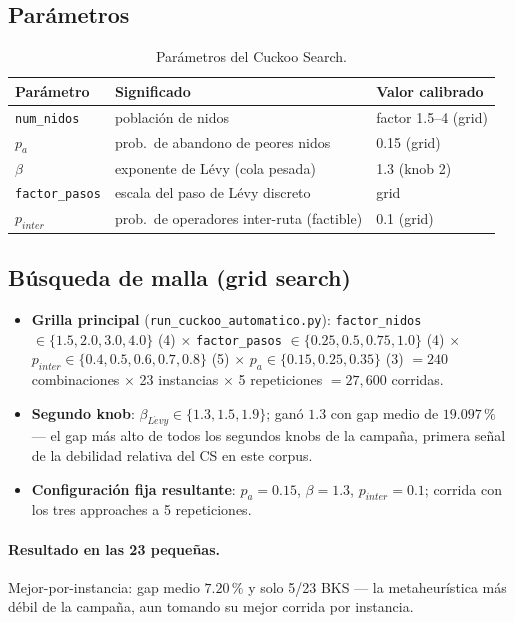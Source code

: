 \subsection{Parámetros}
\begin{table}[htbp]
\centering
\caption{Parámetros del Cuckoo Search.}
\begin{tabular}{lll}
\toprule
Parámetro & Significado & Valor calibrado \\
\midrule
\texttt{num\_nidos} & población de nidos & factor 1.5--4 (grid) \\
$p_a$ & prob.\ de abandono de peores nidos & 0.15 (grid) \\
$\beta$ & exponente de Lévy (cola pesada) & 1.3 (knob 2) \\
\texttt{factor\_pasos} & escala del paso de Lévy discreto & grid \\
$p_{inter}$ & prob.\ de operadores inter-ruta (factible) & 0.1 (grid) \\
\bottomrule
\end{tabular}
\end{table}

\subsection{Búsqueda de malla (grid search)}
\begin{itemize}
  \item \textbf{Grilla principal} (\texttt{run\_cuckoo\_automatico.py}):
    \texttt{factor\_nidos} $\in \{1.5, 2.0, 3.0, 4.0\}$ (4) $\times$
    \texttt{factor\_pasos} $\in \{0.25, 0.5, 0.75, 1.0\}$ (4) $\times$
    $p_{inter} \in \{0.4, 0.5, 0.6, 0.7, 0.8\}$ (5) $\times$
    $p_a \in \{0.15, 0.25, 0.35\}$ (3)
    $= 240$ combinaciones $\times$ 23 instancias $\times$ 5 repeticiones
    $= 27{,}600$ corridas.
  \item \textbf{Segundo knob}: $\beta_{L\acute{e}vy} \in \{1.3, 1.5, 1.9\}$;
    ganó $1.3$ con gap medio de $19.097\,\%$ --- el gap más alto de todos los
    segundos knobs de la campaña, primera señal de la debilidad relativa del
    CS en este corpus.
  \item \textbf{Configuración fija resultante}: $p_a = 0.15$, $\beta = 1.3$,
    $p_{inter} = 0.1$; corrida con los tres approaches a 5 repeticiones.
\end{itemize}

\paragraph{Resultado en las 23 pequeñas.} Mejor-por-instancia: gap medio
$7.20\,\%$ y solo 5/23 BKS --- la metaheurística más débil de la campaña, aun
tomando su mejor corrida por instancia.

